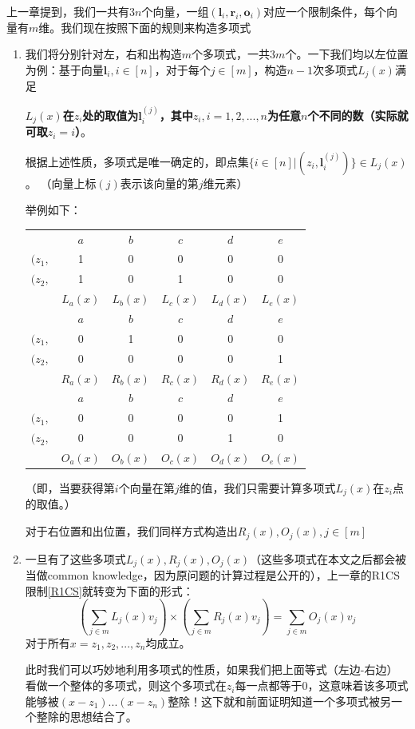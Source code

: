 \documentclass[12pt]{article}
\begin{document}
上一章提到，我们一共有$3n$个向量，一组$(\bm{l}_i,\bm{r}_i,\bm{o}_i)$对应一个限制条件，每个向量有$m$维。我们现在按照下面的规则来构造多项式
\begin{enumerate}
	\item 我们将分别针对左，右和出构造$m$个多项式，一共$3m$个。一下我们均以左位置为例：基于向量$\bm{l}_i,i \in [n]$，对于每个$j \in [m]$，构造$n-1$次多项式$L_j(x)$满足
	
	\textbf{$L_j(x)$在$z_i$处的取值为$\bm{l}_i^{(j)}$，其中$z_i,i=1,2,...,n$为任意$n$个不同的数（实际就可取$z_i=i$）}。
	
	根据上述性质，多项式是唯一确定的，即点集$\{i \in [n]|(z_i,\bm{l}_i^{(j)})\} \in L_j(x)$。   （向量上标$(j)$表示该向量的第$j$维元素）
	
	举例如下：
  \begin{tabular}{c|c|c|c|c|c|}
  	\label{tab:1}
  	             & $a$ & $b$ & $c$ & $d$ & $e$ \\
  	 $(z_1,$   &  1    & 0& 0& 0& 0\\
  	 $(z_2,$  &  1  &   0 & 1 & 0 & 0 \\
  	          &   $L_a(x)$&$L_b(x)$&$L_c(x)$&$L_d(x)$&$L_e(x)$\\
  	  & $a$ & $b$ & $c$ & $d$ & $e$ \\
  	  $(z_1,$   &  0    & 1& 0& 0& 0\\
  	  $(z_2,$  &  0  &   0 & 0 & 0 & 1 \\
  	  &   $R_a(x)$&$R_b(x)$&$R_c(x)$&$R_d(x)$&$R_e(x)$\\
  	    	& $a$ & $b$ & $c$ & $d$ & $e$ \\
  	  $(z_1,$   &  0    & 0& 0& 0& 1\\
  	  $(z_2,$  &  0  &   0 & 0 & 1 & 0 \\
  	  &   $O_a(x)$&$O_b(x)$&$O_c(x)$&$O_d(x)$&$O_e(x)$
  \end{tabular}	

	（即，当要获得第$i$个向量在第$j$维的值，我们只需要计算多项式$L_j(x)$在$z_i$点的取值。）
	
	对于右位置和出位置，我们同样方式构造出$R_j(x),O_j(x), j \in [m]$
	
	\item 一旦有了这些多项式$L_j(x),R_j(x),O_j(x)$（这些多项式在本文之后都会被当做common knowledge，因为原问题的计算过程是公开的），上一章的R1CS限制\ref{R1CS}就转变为下面的形式：
	$$ (\sum_{j \in m} L_j(x)v_j)\times (\sum_{j \in m} R_j(x)v_j) = \sum_{j \in m} O_j(x)v_j$$
	对于所有$x=z_1,z_2,...,z_n$均成立。
	
	此时我们可以巧妙地利用多项式的性质，如果我们把上面等式（左边-右边）看做一个整体的多项式，则这个多项式在$z_i$每一点都等于0，这意味着该多项式能够被$(x-z_1)...(x-z_n)$整除！这下就和前面证明知道一个多项式被另一个整除的思想结合了。
	

\end{enumerate}
\end{document}

